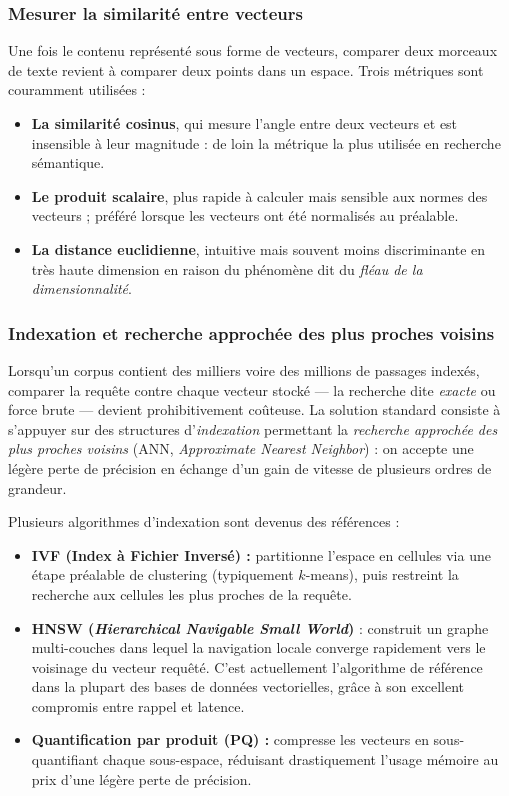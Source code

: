 \documentclass[a4paper,11pt]{article}
\begin{document}
\subsubsection{Mesurer la similarité entre vecteurs}

Une fois le contenu représenté sous forme de vecteurs, comparer deux
morceaux de texte revient à comparer deux points dans un espace. Trois
métriques sont couramment utilisées :

\begin{itemize}
  \item \textbf{La similarité cosinus}, qui mesure l'angle entre deux
    vecteurs et est insensible à leur magnitude : de loin la métrique
    la plus utilisée en recherche sémantique.
  \item \textbf{Le produit scalaire}, plus rapide à calculer mais
    sensible aux normes des vecteurs ; préféré lorsque les vecteurs
    ont été normalisés au préalable.
  \item \textbf{La distance euclidienne}, intuitive mais souvent moins
    discriminante en très haute dimension en raison du phénomène dit
    du \emph{fléau de la dimensionnalité}.
\end{itemize}

\subsubsection{Indexation et recherche approchée des plus proches voisins}

Lorsqu'un corpus contient des milliers voire des millions de passages
indexés, comparer la requête contre chaque vecteur stocké --- la recherche
dite \emph{exacte} ou \og force brute \fg{} --- devient prohibitivement
coûteuse. La solution standard consiste à s'appuyer sur des structures
d'\emph{indexation} permettant la \emph{recherche approchée des plus
proches voisins} (ANN, \emph{Approximate Nearest Neighbor}) : on accepte
une légère perte de précision en échange d'un gain de vitesse de plusieurs
ordres de grandeur.

Plusieurs algorithmes d'indexation sont devenus des références :

\begin{itemize}
  \item \textbf{IVF (Index à Fichier Inversé) :} partitionne l'espace en
    cellules via une étape préalable de clustering (typiquement $k$-means),
    puis restreint la recherche aux cellules les plus proches de la requête.
  \item \textbf{HNSW (\emph{Hierarchical Navigable Small World})}
    \cite{malkov2018hnsw} : construit un graphe multi-couches dans lequel
    la navigation locale converge rapidement vers le voisinage du vecteur
    requêté. C'est actuellement l'algorithme de référence dans la plupart
    des bases de données vectorielles, grâce à son excellent compromis
    entre rappel et latence.
  \item \textbf{Quantification par produit (PQ) :} compresse les vecteurs
    en sous-quantifiant chaque sous-espace, réduisant drastiquement l'usage
    mémoire au prix d'une légère perte de précision.
\end{itemize}
\end{document}

